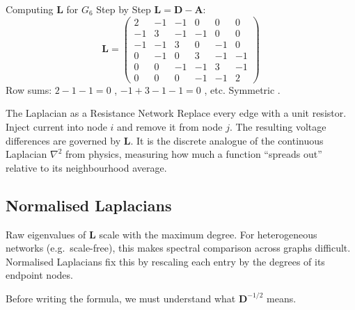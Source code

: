 \begin{examplebox}{Computing $\mathbf{L}$ for $G_6$ Step by Step}
$\mathbf{L} = \mathbf{D} - \mathbf{A}$:
\[
\mathbf{L} = \begin{pmatrix}
 2 & -1 & -1 &  0 &  0 &  0 \\
-1 &  3 & -1 & -1 &  0 &  0 \\
-1 & -1 &  3 &  0 & -1 &  0 \\
 0 & -1 &  0 &  3 & -1 & -1 \\
 0 &  0 & -1 & -1 &  3 & -1 \\
 0 &  0 &  0 & -1 & -1 &  2
\end{pmatrix}
\]
Row sums: $2-1-1=0$ \checkmark, $-1+3-1-1=0$ \checkmark, etc. Symmetric \checkmark.
\end{examplebox}

\begin{analogybox}{The Laplacian as a Resistance Network}
Replace every edge with a unit resistor. Inject current into node $i$ and remove it from node $j$. The resulting voltage differences are governed by $\mathbf{L}$. It is the discrete analogue of the continuous Laplacian $\nabla^2$ from physics, measuring how much a function ``spreads out'' relative to its neighbourhood average.
\end{analogybox}

\subsection{Normalised Laplacians}

Raw eigenvalues of $\mathbf{L}$ scale with the maximum degree. For heterogeneous networks (e.g.\ scale-free), this makes spectral comparison across graphs difficult. Normalised Laplacians fix this by rescaling each entry by the degrees of its endpoint nodes.

Before writing the formula, we must understand what $\mathbf{D}^{-1/2}$ means.

